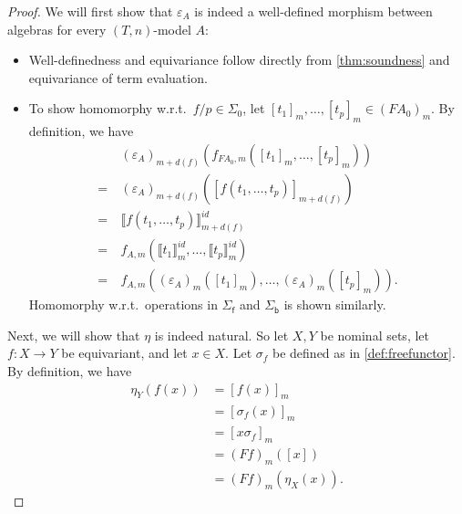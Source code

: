 \documentclass[11pt,a4paper]{amsart}
\newcommand{\sigp}{\Sigma_0}
\newcommand{\sigf}{\Sigma_{\mathsf f}}
\newcommand{\sigb}{\Sigma_{\mathsf b}}
\theoremstyle{plain}
\newcommand{\id}{\mathit{id}}
\numberwithin{equation}{section}
\newcommand{\+}[1]{\mathcal{#1}\xspace}
\theoremstyle{definition}
\begin{document}
\begin{proof}
    We will first show that \(\varepsilon_A\) is indeed a well-defined morphism between algebras for every $(T,n)$-model \(A\):
    \begin{itemize}
        \item
            Well-definedness and equivariance follow directly from \cref{thm:soundness} and equivariance of term evaluation.
        \item
            To show homomorphy w.r.t.~\(f/p \in \sigp\), let \([t_1]_m, \ldots, [t_p]_m \in (FA_0)_m\).
            By definition, we have
            \begin{align*}
                &(\varepsilon_A)_{m + d(f)}(f_{FA_0, m}([t_1]_m, \ldots, [t_p]_m)) \\
                =~&(\varepsilon_A)_{m + d(f)}([f(t_1, \ldots, t_p)]_{m + d(f)}) \\
                =~&\llbracket f(t_1, \ldots, t_p) \rrbracket^{\id}_{m + d(f)} \\
                =~&f_{A, m}(\llbracket t_1 \rrbracket^{\id}_m, \ldots, \llbracket t_p \rrbracket^{\id}_m) \\
                =~&f_{A, m}((\varepsilon_A)_m([t_1]_m), \ldots, (\varepsilon_A)_m([t_p]_m)).
            \end{align*}
            Homomorphy w.r.t.~operations in $\sigf$ and $\sigb$ is shown similarly.
    \end{itemize}

    Next, we will show that \(\eta\) is indeed natural.  So let
    \(X, Y\) be nominal sets, let $f\colon X\to Y$ be equivariant, and
    let \(x \in X\).  Let \(\sigma_f\) be defined as in
    \cref{def:freefunctor}.  By definition, we have
    \begin{align*}
        \eta_Y(f(x))
        &= [f(x)]_m \\
        &= [\sigma_f(x)]_m \\
        &= [x\sigma_f]_m \\
        &= (Ff)_m([x]) \\
        &= (Ff)_m(\eta_X(x)).
    \end{align*}


\end{proof}
\end{document}
